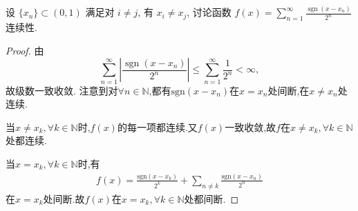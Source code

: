 \documentclass[../../main.tex]{subfiles}%
\begin{document}
\begin{example}
设 $\{x_n\} \subset (0,1)$ 满足对 $i \neq j$, 有 $x_i \neq x_j$, 讨论函数 $f(x) = \sum\limits_{n=1}^\infty \frac{\operatorname{sgn}(x - x_n)}{2^n}$ 连续性.
\end{example}
\begin{proof}
由
\[
\sum\limits_{n=1}^\infty \left| \frac{\operatorname{sgn}(x - x_n)}{2^n} \right| \leqslant \sum\limits_{n=1}^\infty \frac{1}{2^n} < \infty,
\]
故级数一致收敛. 注意到对$\forall n\in \mathbb{N} $,都有$\mathrm{sgn} \left( x-x_n \right) $在$x=x_n$处间断,在$x\ne x_n$处连续.

当$x\ne x_k,\forall k\in \mathbb{N} $时,$f\left( x \right) $的每一项都连续.又$f\left( x \right) $一致收敛,故$f$在$x\ne x_k,\forall k\in \mathbb{N} $处都连续.

当$x=x_k,\forall k\in \mathbb{N} $时,有
\begin{align*}
f\left( x \right) =\frac{\mathrm{sgn} \left( x-x_k \right)}{2^k}+\sum\limits_{n\ne k}{\frac{\mathrm{sgn} \left( x-x_n \right)}{2^n}}
\end{align*}
在$x=x_k$处间断.故$f\left( x \right) $在$x=x_k,\forall k\in \mathbb{N} $处都间断.
\end{proof}
\end{document}
